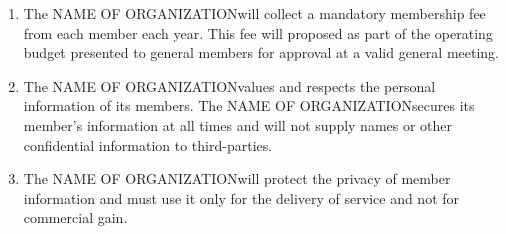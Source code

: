 \documentclass[12pt]{article}
\newcommand{\orgname}{NAME OF ORGANIZATION\space}
\begin{document}
\begin{enumerate}[{3}.1]
\begin{enumerate}[{3.4}.1]
        \item	Respect the rights of peers and fellow members;
        \item	Abide by University of Toronto policies, procedures, and guidelines;
        \item	Abide by the Laws of the Land, including but not limited to the Criminal Code of Canada. 
    \end{enumerate}
    \item The \orgname will collect a mandatory membership fee from each member each year. This fee will proposed as part of the operating budget presented to general members for approval at a valid general meeting. 
    \item The \orgname values and respects the personal information of its members. The \orgname secures its member’s information at all times and will not supply names or other confidential information to third-parties. 
    \item The \orgname will protect the privacy of member information and must use it only for the delivery of service and not for commercial gain.
\end{enumerate}


\end{document}

